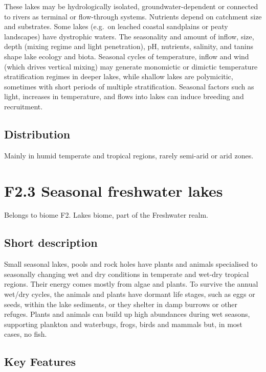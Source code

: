 \documentclass[
  letterpaper,
  DIV=11,
  numbers=noendperiod]{scrartcl}
\begin{document}
These lakes may be hydrologically isolated, groundwater-dependent or
connected to rivers as terminal or flow-through systems. Nutrients
depend on catchment size and substrates. Some lakes (e.g.~on leached
coastal sandplains or peaty landscapes) have dystrophic waters. The
seasonality and amount of inflow, size, depth (mixing regime and light
penetration), pH, nutrients, salinity, and tanins shape lake ecology and
biota. Seasonal cycles of temperature, inflow and wind (which drives
vertical mixing) may generate monomictic or dimictic temperature
stratification regimes in deeper lakes, while shallow lakes are
polymicitic, sometimes with short periods of multiple stratification.
Seasonal factors such as light, increases in temperature, and flows into
lakes can induce breeding and recruitment.

\subsection{Distribution}\label{distribution-9}

Mainly in humid temperate and tropical regions, rarely semi-arid or arid
zones.

\section{F2.3 Seasonal freshwater
lakes}\label{f2.3-seasonal-freshwater-lakes}

Belongs to biome F2. Lakes biome, part of the Freshwater realm.

\subsection{Short description}\label{short-description-10}

Small seasonal lakes, pools and rock holes have plants and animals
specialised to seasonally changing wet and dry conditions in temperate
and wet-dry tropical regions. Their energy comes mostly from algae and
plants. To survive the annual wet/dry cycles, the animals and plants
have dormant life stages, such as eggs or seeds, within the lake
sediments, or they shelter in damp burrows or other refuges. Plants and
animals can build up high abundances during wet seasons, supporting
plankton and waterbugs, frogs, birds and mammals but, in most cases, no
fish.

\subsection{Key Features}\label{key-features-10}
\end{document}
